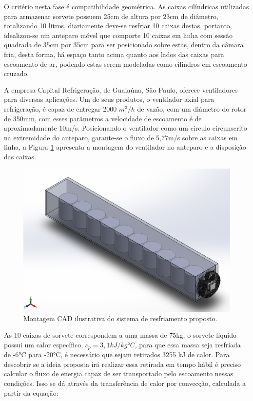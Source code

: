 \documentclass[10pt,a4paper]{article}
\begin{document}
O critério nesta fase é compatibilidade geométrica. As caixas cilíndricas utilizadas para armazenar sorvete possuem 25cm de altura por 23cm de diâmetro, totalizando 10 litros, diariamente deve-se resfriar 10 caixas destas, portanto, idealizou-se um anteparo móvel que comporte 10 caixas em linha com sessão quadrada de 35cm por 35cm para ser posicionado sobre estas, dentro da câmara fria, desta forma, há espaço tanto acima quanto aos lados das caixas para escoamento de ar, podendo estas serem modeladas como cilindros em escoamento cruzado. 

A empresa Capital Refrigeração, de Guaiaúna, São Paulo, oferece ventiladores para diversas aplicações. Um de seus produtos, o ventilador axial para refrigeração, é capaz de entregar 2000 $m^{3}/h$ de vazão, com um diâmetro do rotor de 350mm, com esses parâmetros a velocidade de escoamento é de aproximadamente 10m/s. Posicionando o ventilador como um círculo circunscrito na extremidade do anteparo, garante-se o fluxo de 5,77m/s sobre as caixas em linha, a Figura \ref{anteparo_ventilador} apresenta a montagem do ventilador no anteparo e a disposição das caixas.

\begin{figure}
    \centering
    \includegraphics[scale=0.6]{Figuras/anteparo_ventilador.PNG}
    \caption{Montagem CAD ilustrativa do sistema de resfriamento proposto.}
    \label{anteparo_ventilador}
\end{figure}

As 10 caixas de sorvete correspondem a uma massa de 75kg, o sorvete líquido possui um calor específico, $c_{p} = 3,1 kJ/kg°C$, para que essa massa seja resfriada de -6°C para -20°C, é necessário que sejam retirados 3255 kJ de calor. Para descobrir se a ideia proposta irá realizar essa retirada em tempo hábil é preciso calcular o fluxo de energia capaz de ser transportado pelo escoamento nessas condições. Isso se dá através da transferência de calor por convecção, calculada a partir da equação:
\end{document}

